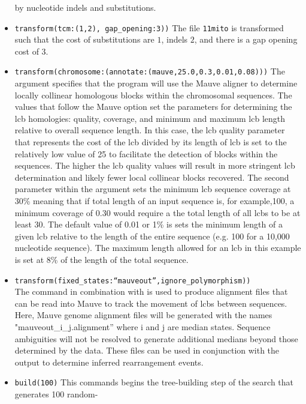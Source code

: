 \begin{itemize}
by nucleotide indels and substitutions.  
\item \texttt{transform(tcm:(1,2), gap\_opening:3))} The file \texttt{11mito} is transformed such that the cost of substitutions 
are $1$, indels $2$, and there is a gap opening cost of $3$.
\item \texttt{transform(chromosome:(annotate:(mauve,25.0,0.3,0.01,0.08)))} The argument  
specifies that the program will use the Mauve aligner \cite{darlingetal2004} to determine locally collinear 
homologous blocks within the chromosomal sequences.  The values that follow the Mauve option set the parameters 
for determining the lcb homologies: quality, coverage, and minimum and maximum lcb length relative to overall 
sequence length. In this case, the lcb quality parameter that represents the cost of the lcb divided by its length of lcb 
is set to the relatively low value of 25 to facilitate the detection of blocks within the sequences.  The higher the lcb 
quality values will result in more stringent lcb determination and likely fewer local collinear blocks recovered.  The 
second parameter within the argument  sets the minimum lcb sequence coverage at 
30\% meaning that if total length of an input sequence is, for example,100, a minimum coverage of 0.30 would require 
a the total length of all lcbs to be at least 30. The default value of 0.01 or 1\% is sets the minimum length of a given lcb 
relative to the length of the entire sequence (e.g. 100 for a 10,000 nucleotide sequence). The maximum length 
allowed for an lcb in this example is set at 8\% of the length of the total sequence.
\item \texttt{transform(fixed\_states:``mauveout'',ignore\_polymorphism))}  \\The {} command 
in combination with  is used to produce alignment files that 
can be read into Mauve to track the movement of lcbs between sequences. Here, Mauve genome alignment files will be generated 
with the names "mauveout\_i\_j.alignment'' where i and j are median states. Sequence ambiguities will not be resolved to generate additional 
medians beyond those determined by the data. These files can be used in conjunction with the  output to
determine inferred rearrangement events. 
\item \texttt{build(100)} This commands begins the tree-building step of the search that generates 100 random-

\end{itemize}
